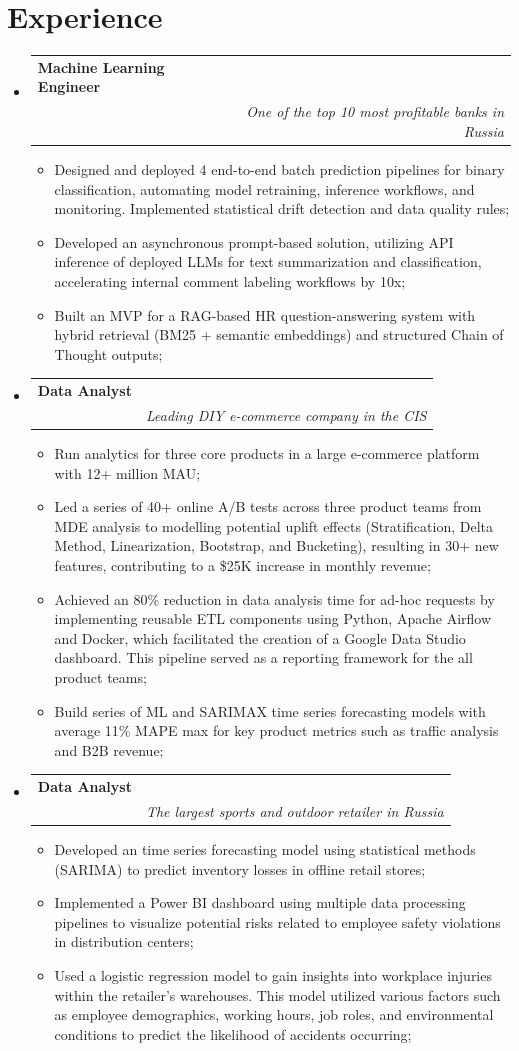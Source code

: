 \documentclass[letterpaper,11pt]{article}
\makeatletter
\newcommand{\resumeItem}[1]{
  \item\small{
    {#1 \vspace{-1pt}}
  }
}
\newcommand{\resumeSubheading}[4]{
  \vspace{-2pt}\item
    \begin{tabular*}{0.97\textwidth}[t]{l@{\extracolsep{\fill}}r}
      \textbf{#1} & \normalfont{#2} \\
      \normalfont{#3} & \textit{#4} \\
    \end{tabular*}\vspace{-5pt}
}
\newcommand{\resumeSubHeadingListStart}{\begin{itemize}[leftmargin=0.15in, label={}]}
\newcommand{\resumeSubHeadingListEnd}{\end{itemize}}
\newcommand{\resumeItemListStart}{\begin{itemize}}
\newcommand{\resumeItemListEnd}{\end{itemize}}
\makeatother
\begin{document}
\section{Experience}
  \vspace{3pt}
  \resumeSubHeadingListStart

    \resumeSubheading
      {Machine Learning Engineer}{Jun 2024 -- Present}
      {Raiffeisenbank}{One of the top 10 most profitable banks in Russia}
        \resumeItemListStart
            \resumeItem{Designed and deployed 4 end-to-end batch prediction pipelines for binary classification, automating model retraining, inference workflows, and monitoring. Implemented statistical drift detection and data quality rules;}
            \resumeItem{Developed an asynchronous prompt-based solution, utilizing API inference of deployed LLMs for text summarization and classification, accelerating internal comment labeling workflows by 10x;}
            \resumeItem{Built an MVP for a RAG-based HR question-answering system with hybrid retrieval (BM25 + semantic embeddings) and structured Chain of Thought outputs;}
        \resumeItemListEnd

    \resumeSubheading
      {Data Analyst}{Jun 2023 -- Feb 2024}
      {VseInstrumenti.ru}{Leading DIY e-commerce company in the CIS}
        \resumeItemListStart
            \resumeItem{Run analytics for three core products in a large e-commerce platform with 12+ million MAU;}
            \resumeItem{Led a series of 40+ online A/B tests across three product teams from MDE analysis to modelling potential uplift effects (Stratification, Delta Method, Linearization, Bootstrap, and Bucketing),
            resulting in 30+ new features, contributing to a \$25K increase in monthly revenue;}
            \resumeItem{Achieved an 80\% reduction in data analysis time for ad-hoc requests by implementing reusable ETL 
            components using Python, Apache Airflow and Docker, which facilitated the creation of a Google Data Studio dashboard. This pipeline served as a reporting framework for the all product teams;}
            \resumeItem{Build series of ML and SARIMAX time series forecasting models with average 11\% MAPE max for key product metrics such as traffic analysis and B2B revenue;}
        \resumeItemListEnd

    \resumeSubheading
    {Data Analyst}{Jan 2023 -- Jun 2023}
    {Sportmaster}{The largest sports and outdoor retailer in Russia}
      \resumeItemListStart
          \resumeItem{Developed an time series forecasting model using statistical methods (SARIMA) to predict inventory losses in offline retail stores;}
          \resumeItem{Implemented a Power BI dashboard using multiple data processing pipelines to visualize potential risks related to employee safety violations in distribution centers;}
          \resumeItem{Used a logistic regression model to gain insights into workplace injuries within the retailer's warehouses. 
          This model utilized various factors such as employee demographics, working hours, job roles, and environmental conditions to predict the likelihood of accidents occurring;}
      \resumeItemListEnd
  \resumeSubHeadingListEnd
\end{document}
